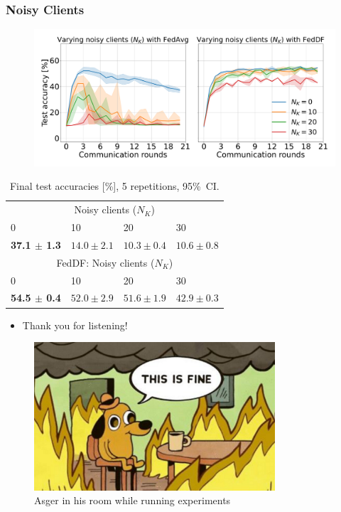 \documentclass{beamer}
\begin{document}
\begin{frame}
    \frametitle{Noisy Clients}
    \begin{figure}[H]
        \centering
	\includegraphics[width=.7\linewidth]{imgs/noisy_clients.pdf}
    \end{figure}\noindent
\begin{table}[htb!]
    \centering
    \footnotesize
    \begin{tabular}{llll}
       \hline
        \multicolumn{4}{c}{Noisy clients ($N_K$)}\\
        0 & 10 & 20 & 30 \\
       \hline
        \textbf{ 37.1 $\pm$ 1.3 } & $14.0 \pm 2.1$ & $10.3 \pm 0.4$ & $10.6 \pm 0.8$ \\
        \multicolumn{4}{c}{FedDF: Noisy clients ($N_K$)}\\
        0 & 10 & 20 & 30 \\
       \hline
        \textbf{ 54.5 $\pm $ 0.4 } & $52.0 \pm 2.9$ & $51.6 \pm 1.9$ & $42.9 \pm 0.3$ \\
\end{tabular}
    \caption{
    Final test accuracies [\%], 5 repetitions, 95\%\ CI.
    }
\end{table}
\end{frame}

\begin{frame}
    \begin{itemize}
        \item Thank you for listening!
    \end{itemize}
    \begin{figure}
    \centering
    \includegraphics[width=0.8\textwidth]{imgs/maymay.jpg}
    \caption{Asger in his room while running experiments}
    \end{figure}
\end{frame}
\end{document}
